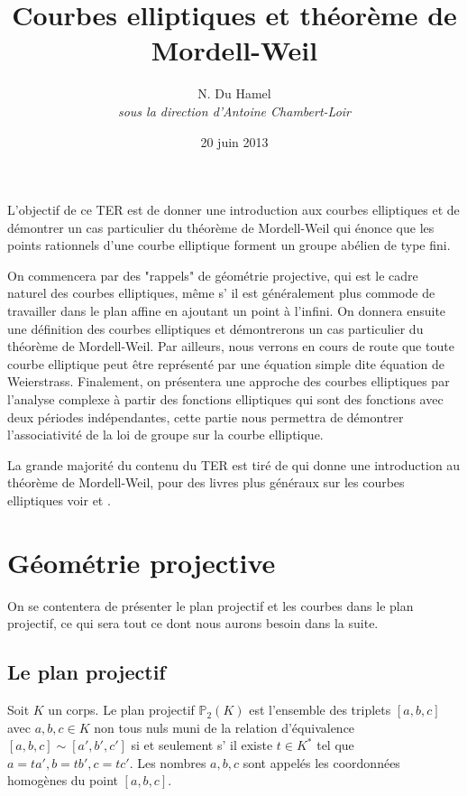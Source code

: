 \documentclass{article}
\begin{document}
\title{Courbes elliptiques et théorème de Mordell-Weil}
\date{20 juin 2013}
\author{N. Du Hamel \\ \emph{sous la direction d'Antoine Chambert-Loir}}
\maketitle


L'objectif de ce TER est de donner une introduction aux courbes elliptiques et de démontrer un cas
particulier du théorème de Mordell-Weil qui énonce que les points rationnels d'une courbe elliptique
forment un groupe abélien de type fini.

On commencera par des "rappels" de géométrie projective, qui est le cadre naturel des courbes elliptiques,
même s’ il est généralement plus commode de travailler dans le plan affine en ajoutant un point à l'infini.
On donnera ensuite une définition des courbes elliptiques et démontrerons un cas particulier du
théorème de Mordell-Weil.
Par ailleurs, nous verrons en cours de route que toute courbe elliptique peut être représenté par
une équation simple dite équation de Weierstrass.
Finalement, on présentera une approche des courbes elliptiques par l'analyse complexe à partir des
fonctions elliptiques qui sont des fonctions avec deux périodes indépendantes, cette partie nous permettra
de démontrer l'associativité de la loi de groupe sur la courbe elliptique.

La grande majorité du contenu du TER est tiré de \cite{silverman_rational_1992} qui donne une introduction au
théorème de Mordell-Weil, pour des livres plus généraux sur les courbes elliptiques voir
\cite{cassels_lectures_1991} et \cite{mckean_elliptic_1999}.

\section{Géométrie projective}
On se contentera de présenter le plan projectif et les courbes dans le plan projectif, ce qui sera
tout ce dont nous aurons besoin dans la suite.
\subsection{Le plan projectif}
Soit $K$ un corps. Le plan projectif $\mathbb{P}_{2}(K)$ est l'ensemble des triplets $[a,b,c]$ avec $a,b,c \in K$ non tous nuls
muni de la relation d'équivalence $[a,b,c] \sim [a',b',c']$ si et seulement s’ il existe 
$t\in K^{*}$ tel que $a=ta', b=tb', c=tc'$. Les nombres $a,b,c$ sont appelés les coordonnées homogènes
du point $[a,b,c]$.
\end{document}
